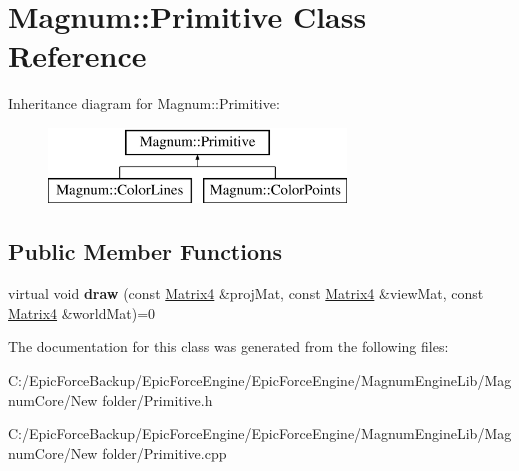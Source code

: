 \hypertarget{class_magnum_1_1_primitive}{}\section{Magnum\+:\+:Primitive Class Reference}
\label{class_magnum_1_1_primitive}
Inheritance diagram for Magnum\+:\+:Primitive\+:\begin{figure}[H]
\begin{center}
\leavevmode
\includegraphics[height=2.000000cm]{class_magnum_1_1_primitive}
\end{center}
\end{figure}
\subsection*{Public Member Functions}
\begin{DoxyCompactItemize}
\item 
virtual void {\bfseries draw} (const \hyperlink{class_magnum_1_1_matrix4}{Matrix4} \&proj\+Mat, const \hyperlink{class_magnum_1_1_matrix4}{Matrix4} \&view\+Mat, const \hyperlink{class_magnum_1_1_matrix4}{Matrix4} \&world\+Mat)=0\hypertarget{class_magnum_1_1_primitive_a452d913c209338a7df4ccd5edd552315}{}\label{class_magnum_1_1_primitive_a452d913c209338a7df4ccd5edd552315}

\end{DoxyCompactItemize}


The documentation for this class was generated from the following files\+:\begin{DoxyCompactItemize}
\item 
C\+:/\+Epic\+Force\+Backup/\+Epic\+Force\+Engine/\+Epic\+Force\+Engine/\+Magnum\+Engine\+Lib/\+Magnum\+Core/\+New folder/Primitive.\+h\item 
C\+:/\+Epic\+Force\+Backup/\+Epic\+Force\+Engine/\+Epic\+Force\+Engine/\+Magnum\+Engine\+Lib/\+Magnum\+Core/\+New folder/Primitive.\+cpp\end{DoxyCompactItemize}
